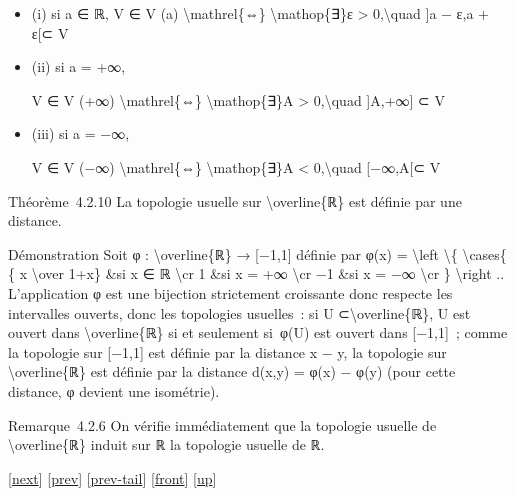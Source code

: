 \documentclass[]{article}
\begin{document}
\begin{itemize}
\item
  (i) si a ∈ ℝ, V ∈ V (a) \textbackslash{}mathrel\{⇔\}
  \textbackslash{}mathop\{∃\}ε \textgreater{} 0,\textbackslash{}quad
  {]}a − ε,a + ε{[}⊂ V
\item
  (ii) si a = +∞,

  V ∈ V (+∞) \textbackslash{}mathrel\{⇔\} \textbackslash{}mathop\{∃\}A
  \textgreater{} 0,\textbackslash{}quad {]}A,+∞{]} ⊂ V
\item
  (iii) si a = −∞,

  V ∈ V (−∞) \textbackslash{}mathrel\{⇔\} \textbackslash{}mathop\{∃\}A
  \textless{} 0,\textbackslash{}quad {[}−∞,A{[}⊂ V
\end{itemize}

Théorème~4.2.10 La topologie usuelle sur \textbackslash{}overline\{ℝ\}
est définie par une distance.

Démonstration Soit φ : \textbackslash{}overline\{ℝ\} → {[}−1,1{]}
définie par φ(x) = \textbackslash{}left \textbackslash{}\{
\textbackslash{}cases\{ \{ x \textbackslash{}over
1+\textbar{}x\textbar{}\} \&si x ∈ ℝ \textbackslash{}cr 1 \&si x = +∞
\textbackslash{}cr −1 \&si x = −∞ \textbackslash{}cr \}
\textbackslash{}right .. L'application φ est une bijection strictement
croissante donc respecte les intervalles ouverts, donc les topologies
usuelles~: si U ⊂\textbackslash{}overline\{ℝ\}, U est ouvert dans
\textbackslash{}overline\{ℝ\} si et seulement si~φ(U) est ouvert dans
{[}−1,1{]}~; comme la topologie sur {[}−1,1{]} est définie par la
distance \textbar{}x − y\textbar{}, la topologie sur
\textbackslash{}overline\{ℝ\} est définie par la distance d(x,y) =
\textbar{}φ(x) − φ(y)\textbar{} (pour cette distance, φ devient une
isométrie).

Remarque~4.2.6 On vérifie immédiatement que la topologie usuelle de
\textbackslash{}overline\{ℝ\} induit sur ℝ la topologie usuelle de ℝ.

{[}\href{coursse20.html}{next}{]} {[}\href{coursse18.html}{prev}{]}
{[}\href{coursse18.html\#tailcoursse18.html}{prev-tail}{]}
{[}\href{coursse19.html}{front}{]}
{[}\href{coursch5.html\#coursse19.html}{up}{]}
\end{document}
